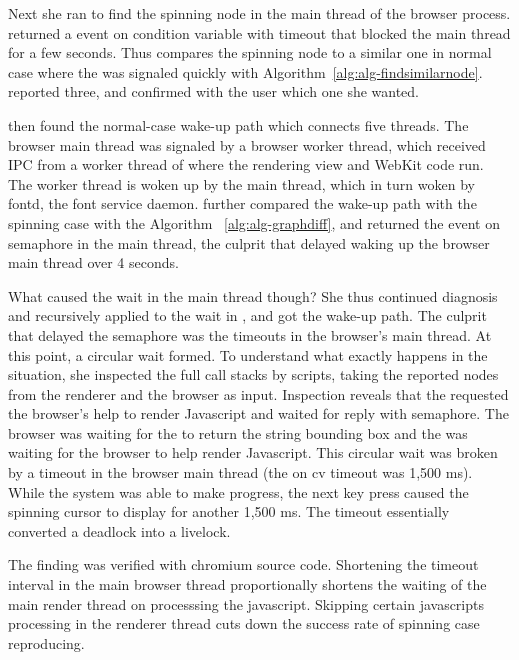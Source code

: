 Next she ran \xxx to find the spinning node in the main thread of the browser
process. \xxx returned a  event on condition variable with timeout that
blocked the main thread for a few seconds. Thus \xxx compares the spinning node
to a similar one in normal case where the  was signaled quickly with
Algorithm~\ref{alg:alg-findsimilarnode}. \xxx reported three, and confirmed with
the user which one she wanted.

\xxx then found the normal-case wake-up path which connects five threads. The
browser main thread was signaled by a browser worker thread, which received IPC
from a worker thread of  where the rendering view and WebKit code
run. The worker thread is woken up by the  main thread, which in
turn woken by fontd, the font service daemon. \xxx further compared the wake-up
path with the spinning case with the Algorithm ~\ref{alg:alg-graphdiff}, and
returned the  event on semaphore in the  main thread, the
culprit that delayed waking up the browser main thread over 4 seconds.

What caused the wait in the  main thread though? She thus continued
diagnosis and recursively applied \xxx to the wait in , and got
the wake-up path. The culprit that delayed the semaphore was the timeouts in
the browser's main thread. At this point, a circular wait formed. To understand
what exactly happens in the situation, she inspected the full call stacks by
\xxx scripts, taking the reported nodes from the renderer and the browser as
input. Inspection reveals that the  requested the browser's help to
render Javascript and waited for reply with semaphore. The browser was waiting
for the  to return the string bounding box and the 
was waiting for the browser to help render Javascript. This circular wait was
broken by a timeout in the browser main thread (the  on cv timeout was
1,500 ms). While the system was able to make progress, the next key press caused
the spinning cursor to display for another 1,500 ms. The timeout essentially
converted a deadlock into a livelock.

The finding was verified with chromium source code. Shortening the timeout interval
in the main browser thread proportionally shortens the waiting of the main
render thread on processsing the javascript. Skipping certain javascripts
processing in the renderer thread cuts down the success rate of spinning case
reproducing.

